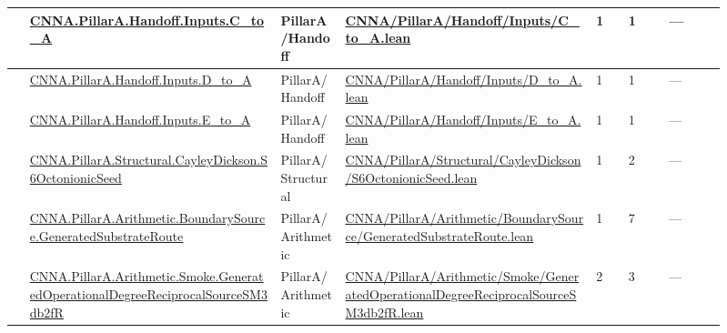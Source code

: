 \begin{longtable}{L{0.025\linewidth} L{0.315\linewidth} L{0.08\linewidth} L{0.315\linewidth} L{0.045\linewidth} L{0.055\linewidth} L{0.07\linewidth}}
\hline
{} & \href{run:repo_snapshot/CNNA/PillarA/Handoff/Inputs/C_to_A.lean}{CNNA.\allowbreak{}PillarA.\allowbreak{}Handoff.\allowbreak{}Inputs.\allowbreak{}C\_to\_A} & PillarA/\allowbreak{}Handoff & \href{run:repo_snapshot/CNNA/PillarA/Handoff/Inputs/C_to_A.lean}{CNNA/\allowbreak{}PillarA/\allowbreak{}Handoff/\allowbreak{}Inputs/\allowbreak{}C\_to\_A.\allowbreak{}lean} & 1 & 1 & ---\\
\hline
{} & \href{run:repo_snapshot/CNNA/PillarA/Handoff/Inputs/D_to_A.lean}{CNNA.\allowbreak{}PillarA.\allowbreak{}Handoff.\allowbreak{}Inputs.\allowbreak{}D\_to\_A} & PillarA/\allowbreak{}Handoff & \href{run:repo_snapshot/CNNA/PillarA/Handoff/Inputs/D_to_A.lean}{CNNA/\allowbreak{}PillarA/\allowbreak{}Handoff/\allowbreak{}Inputs/\allowbreak{}D\_to\_A.\allowbreak{}lean} & 1 & 1 & ---\\
\hline
{} & \href{run:repo_snapshot/CNNA/PillarA/Handoff/Inputs/E_to_A.lean}{CNNA.\allowbreak{}PillarA.\allowbreak{}Handoff.\allowbreak{}Inputs.\allowbreak{}E\_to\_A} & PillarA/\allowbreak{}Handoff & \href{run:repo_snapshot/CNNA/PillarA/Handoff/Inputs/E_to_A.lean}{CNNA/\allowbreak{}PillarA/\allowbreak{}Handoff/\allowbreak{}Inputs/\allowbreak{}E\_to\_A.\allowbreak{}lean} & 1 & 1 & ---\\
\hline
{} & \href{run:repo_snapshot/CNNA/PillarA/Structural/CayleyDickson/S6OctonionicSeed.lean}{CNNA.\allowbreak{}PillarA.\allowbreak{}Structural.\allowbreak{}CayleyDickson.\allowbreak{}S6OctonionicSeed} & PillarA/\allowbreak{}Structural & \href{run:repo_snapshot/CNNA/PillarA/Structural/CayleyDickson/S6OctonionicSeed.lean}{CNNA/\allowbreak{}PillarA/\allowbreak{}Structural/\allowbreak{}CayleyDickson/\allowbreak{}S6OctonionicSeed.\allowbreak{}lean} & 1 & 2 & ---\\
\hline
{} & \href{run:repo_snapshot/CNNA/PillarA/Arithmetic/BoundarySource/GeneratedSubstrateRoute.lean}{CNNA.\allowbreak{}PillarA.\allowbreak{}Arithmetic.\allowbreak{}BoundarySource.\allowbreak{}GeneratedSubstrateRoute} & PillarA/\allowbreak{}Arithmetic & \href{run:repo_snapshot/CNNA/PillarA/Arithmetic/BoundarySource/GeneratedSubstrateRoute.lean}{CNNA/\allowbreak{}PillarA/\allowbreak{}Arithmetic/\allowbreak{}BoundarySource/\allowbreak{}GeneratedSubstrateRoute.\allowbreak{}lean} & 1 & 7 & ---\\
\hline
{} & \href{run:repo_snapshot/CNNA/PillarA/Arithmetic/Smoke/GeneratedOperationalDegreeReciprocalSourceSM3db2fR.lean}{CNNA.\allowbreak{}PillarA.\allowbreak{}Arithmetic.\allowbreak{}Smoke.\allowbreak{}GeneratedOperationalDegreeReciprocalSourceSM3db2fR} & PillarA/\allowbreak{}Arithmetic & \href{run:repo_snapshot/CNNA/PillarA/Arithmetic/Smoke/GeneratedOperationalDegreeReciprocalSourceSM3db2fR.lean}{CNNA/\allowbreak{}PillarA/\allowbreak{}Arithmetic/\allowbreak{}Smoke/\allowbreak{}GeneratedOperationalDegreeReciprocalSourceSM3db2fR.\allowbreak{}lean} & 2 & 3 & ---\\

\end{longtable}
